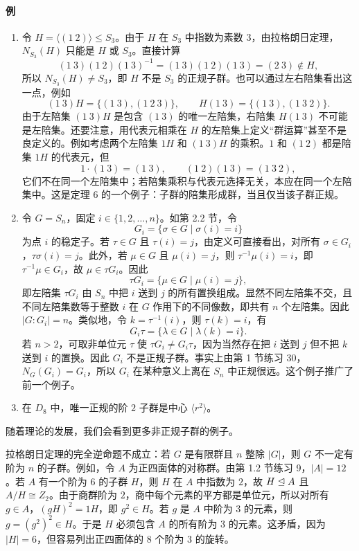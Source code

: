 \paragraph{例}
\begin{enumerate}[label=(\arabic*)]
  \item 令 $H=\langle(1\ 2)\rangle\leq S_3$。由于 $H$ 在 $S_3$ 中指数为素数 $3$，由拉格朗日定理，$N_{S_3}(H)$ 只能是 $H$ 或 $S_3$。直接计算
  \[
    (1\ 3)(1\ 2)(1\ 3)^{-1}=(1\ 3)(1\ 2)(1\ 3)=(2\ 3)\notin H,
  \]
  所以 $N_{S_3}(H)\neq S_3$，即 $H$ 不是 $S_3$ 的正规子群。也可以通过左右陪集看出这一点，例如
  \[
    (1\ 3)H=\{(1\ 3),(1\ 2\ 3)\},\qquad
    H(1\ 3)=\{(1\ 3),(1\ 3\ 2)\}.
  \]
  由于左陪集 $(1\ 3)H$ 是包含 $(1\ 3)$ 的唯一左陪集，右陪集 $H(1\ 3)$ 不可能是左陪集。还要注意，用代表元相乘在 $H$ 的左陪集上定义“群运算”甚至不是良定义的。例如考虑两个左陪集 $1H$ 和 $(1\ 3)H$ 的乘积。$1$ 和 $(1\ 2)$ 都是陪集 $1H$ 的代表元，但
  \[
    1\cdot(1\ 3)=(1\ 3),\qquad
    (1\ 2)(1\ 3)=(1\ 3\ 2),
  \]
  它们不在同一个左陪集中；若陪集乘积与代表元选择无关，本应在同一个左陪集中。这是定理 6 的一个例子：子群的陪集形成群，当且仅当该子群正规。
  \item 令 $G=S_n$，固定 $i\in\{1,2,\ldots,n\}$。如第 2.2 节，令
  \[
    G_i=\{\sigma\in G\mid \sigma(i)=i\}
  \]
  为点 $i$ 的稳定子。若 $\tau\in G$ 且 $\tau(i)=j$，由定义可直接看出，对所有 $\sigma\in G_i$，$\tau\sigma(i)=j$。此外，若 $\mu\in G$ 且 $\mu(i)=j$，则 $\tau^{-1}\mu(i)=i$，即 $\tau^{-1}\mu\in G_i$，故 $\mu\in\tau G_i$。因此
  \[
    \tau G_i=\{\mu\in G\mid \mu(i)=j\},
  \]
  即左陪集 $\tau G_i$ 由 $S_n$ 中把 $i$ 送到 $j$ 的所有置换组成。显然不同左陪集不交，且不同左陪集数等于整数 $i$ 在 $G$ 作用下的不同像数，即共有 $n$ 个左陪集。因此 $|G:G_i|=n$。类似地，令 $k=\tau^{-1}(i)$，则 $\tau(k)=i$，有
  \[
    G_i\tau=\{\lambda\in G\mid \lambda(k)=i\}.
  \]
  若 $n>2$，可取非单位元 $\tau$ 使 $\tau G_i\neq G_i\tau$，因为当然存在把 $i$ 送到 $j$ 但不把 $k$ 送到 $i$ 的置换。因此 $G_i$ 不是正规子群。事实上由第 1 节练习 30，$N_G(G_i)=G_i$，所以 $G_i$ 在某种意义上离在 $S_n$ 中正规很远。这个例子推广了前一个例子。
  \item 在 $D_8$ 中，唯一正规的阶 $2$ 子群是中心 $\langle r^2\rangle$。
\end{enumerate}

随着理论的发展，我们会看到更多非正规子群的例子。

拉格朗日定理的完全逆命题不成立：若 $G$ 是有限群且 $n$ 整除 $|G|$，则 $G$ 不一定有阶为 $n$ 的子群。例如，令 $A$ 为正四面体的对称群。由第 1.2 节练习 9，$|A|=12$。若 $A$ 有一个阶为 $6$ 的子群 $H$，则 $H$ 在 $A$ 中指数为 $2$，故 $H\trianglelefteq A$ 且 $A/H\cong Z_2$。由于商群阶为 $2$，商中每个元素的平方都是单位元，所以对所有 $g\in A$，$(gH)^2=1H$，即 $g^2\in H$。若 $g$ 是 $A$ 中阶为 $3$ 的元素，则 $g=(g^2)^2\in H$。于是 $H$ 必须包含 $A$ 的所有阶为 $3$ 的元素。这矛盾，因为 $|H|=6$，但容易列出正四面体的 $8$ 个阶为 $3$ 的旋转。

